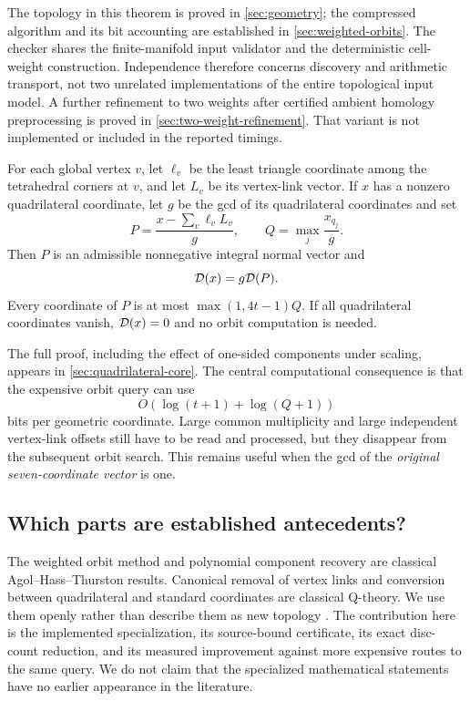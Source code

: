 The topology in this theorem is proved in \cref{sec:geometry}; the compressed
algorithm and its bit accounting are established in \cref{sec:weighted-orbits}.
The checker shares the finite-manifold input validator and the deterministic
cell-weight construction. Independence therefore concerns discovery and
arithmetic transport, not two unrelated implementations of the entire
topological input model.
A further refinement to two weights after certified ambient homology
preprocessing is proved in \cref{sec:two-weight-refinement}. That variant is
not implemented or included in the reported timings.

\begin{theorem}\label{thm:main-core}
For each global vertex $v$, let $\ell_v$ be the least triangle coordinate
among the tetrahedral corners at $v$, and let $L_v$ be its vertex-link vector.
If $x$ has a nonzero quadrilateral coordinate, let $g$ be the gcd of its
quadrilateral coordinates and set
\[
 P=\frac{x-\sum_v\ell_v L_v}{g},\qquad
 Q=\max_j\frac{x_{q_j}}{g}.
\]
Then $P$ is an admissible nonnegative integral normal vector and
\[
                  \mathcal D(x)=g\mathcal D(P).
\]
Every coordinate of $P$ is at most $\max(1,4t-1)Q$. If all quadrilateral
coordinates vanish, $\mathcal D(x)=0$ and no orbit computation is needed.
\end{theorem}

The full proof, including the effect of one-sided components under scaling,
appears in \cref{sec:quadrilateral-core}. The central computational consequence is that
the expensive orbit query can use
\[
                    O(\log(t+1)+\log(Q+1))
\]
bits per geometric coordinate. Large common multiplicity and large independent
vertex-link offsets still have to be read and processed, but they disappear
from the subsequent orbit search. This remains useful when the gcd of the
\emph{original seven-coordinate vector} is one.

\subsection{Which parts are established antecedents?}

The weighted orbit method and polynomial component recovery are classical
Agol--Hass--Thurston results. Canonical removal of vertex links and conversion
between quadrilateral and standard coordinates are classical Q-theory.
We use them openly rather than describe them as new topology
\cite{AHT2006,Tollefson1998,Burton2009}. The contribution here is the implemented
specialization, its source-bound certificate, its exact disc-count reduction,
and its measured improvement against more expensive routes to the same query.
We do not claim that the specialized mathematical statements have no earlier
appearance in the literature.

